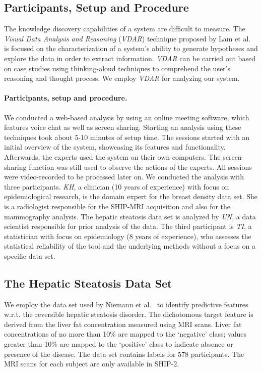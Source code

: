 \documentclass[journal]{style/vgtc} 			          %
\begin{document}
\subsection{Participants, Setup and Procedure}
The knowledge discovery capabilities of a system are difficult to measure.
The \emph{Visual Data Analysis and Reasoning} (\emph{VDAR}) technique proposed by Lam et al.~\cite{Lam2012} is focused on the characterization of a system's ability to generate hypotheses and explore the data in order to extract information.
\emph{VDAR} can be carried out based on case studies using thinking-aloud techniques to comprehend the user's reasoning and thought process.
We employ \emph{VDAR} for analyzing our system.
\paragraph{Participants, setup and procedure.}
We conducted a web-based analysis by using an online meeting software, which features voice chat as well as screen sharing.
Starting an analysis using these techniques took about 5-10 minutes of setup time.
The sessions started with an initial overview of the system, showcasing its features and functionality.
Afterwards, the experts used the system on their own computers.
The screen-sharing function was still used to observe the actions of the experts.
All sessions were video-recorded to be processed later on.
We conducted the analysis with three participants.
\emph{KH}, a clinician (10 years of experience) with focus on epidemiological research, is the domain expert for the breast density data set.
She is a radiologist responsible for the SHIP-MRI acquisition and also for the mammography analysis.
The hepatic steatosis data set is analyzed by \emph{UN}, a data scientist responsible for prior analysis of the data.
The third participant is \emph{TI}, a statistician with focus on epidemiology (8 years of experience), who assesses the statistical reliability of the tool and the underlying methods without a focus on a specific data set.
\subsection{The Hepatic Steatosis Data Set}
We employ the data set used by Niemann et al.~\cite{Niemann2014} to identify predictive features w.r.t. the reversible hepatic steatosis disorder.
The dichotomous target feature is derived from the liver fat concentration measured using MRI scans.
Liver fat concentrations of no more than 10\% are mapped to the `negative' class; values greater than 10\% are mapped to the `positive' class to indicate absence or presence of the disease.
The data set contains labels for 578 participants. %
The MRI scans for each subject are only available in SHIP-2. %
\end{document}
